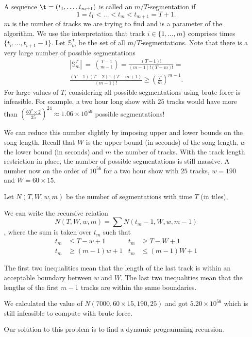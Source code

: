 \documentclass[twocolumn]{article}
\newcommand{\segs}{\mathbb S}
\begin{document}
A sequence $\t = (t_1, \ldots, t_{m+1})$ is called an $m/T$-segmentation if
\[
1 = t_1 < \ldots < t_m < t_{m+1} = T+1.
\]
$m$ is the number of tracks we are trying to find and is a parameter of the algorithm. We use the interpretation that track $i \in \{1, \ldots, m\}$ comprises times $\{t_i, \ldots, t_{i+1}-1\}$. Let $\segs^T_m$ be the set of all $m/T$-segmentations. Note that there is a very large number of possible segmentations 
\begin{multline*}
|\segs^T_m| ~=~ \binom{T-1}{m-1}
= \frac{(T-1)!}{(m-1)!(T-m)!} =\\
 \frac{(T-1)(T-2)\cdots(T-m+1)}{(m-1)!} \ge \left( \frac{T}{m}\right)^{m-1}.
\end{multline*} 
For large values of $T$, considering all possible segmentations using brute force is infeasible. For example, a two hour long show with $25$ tracks would have more than $\left( \frac{60^2 \times 2}{25}\right)^{24}  \approx 1.06 \times 10^{59}$ possible segmentations! 

We can reduce this number slightly by imposing upper and lower bounds on the song length.  Recall that $W$ is the upper bound (in seconds) of the song length, $w$ the lower bound (in seconds) and $m$ the number of tracks. With the track length restriction in place, the number of possible segmentations is still massive. A number now on the order of $10^{56}$ for a two hour show with $25$ tracks, $w=190$ and $W=60\times15$.



  Let $N(T,W,w,m)$ be the number of segmentations with time $T$ (in tiles),

We can write the recursive relation $$N(T,W,w,m) = \sum N(t_m-1,W,w,m-1)$$, where the sum is taken over $t_m$ such that 
\begin{align*}
t_m &\le T-w+1 & t_m &\ge T-W+1\\
t_m &\ge (m-1)w+1 & t_m &\le (m-1)W+1
\end{align*}

The first two inequalities mean that the length of the last track is within an acceptable boundary between $w$ and $W$. The last two inequalities mean that the lengths of the first $m-1$ tracks are within the same boundaries. 

We calculated the value of $N(7000, 60\times15, 190, 25)$ and got $5.20 \times 10^{56}$ which is still infeasible to compute with brute force.



Our solution to this problem is to find a dynamic programming recursion.
\end{document}
